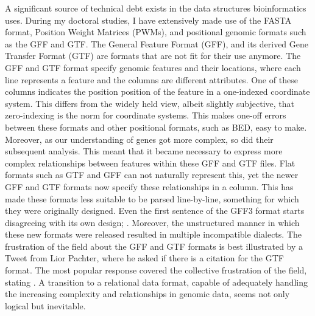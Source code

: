 A significant source of technical debt exists in the data structures bioinformatics uses. During my doctoral studies, I have extensively made use of the FASTA format, Position Weight Matrices (PWMs), and positional genomic formats such as the GFF and GTF. The General Feature Format (GFF), and its derived Gene Transfer Format (GTF) are formats that are not fit for their use anymore. The GFF and GTF format specify genomic features and their locations, where each line represents a feature and the columns are different attributes. One of these columns indicates the position position of the feature in a one-indexed coordinate system. This differs from the widely held view, albeit slightly subjective, that zero-indexing is the norm for coordinate systems\cite{utexasEWDijkstra}. This makes one-off errors between these formats and other positional formats, such as BED, easy to make. Moreover, as our understanding of genes got more complex, so did their subsequent analysis. This meant that it became necessary to express more complex relationships between features within these GFF and GTF files. Flat formats such as GTF and GFF can not naturally represent this, yet the newer GFF and GTF formats now specify these relationships in a  column. This has made these formats less suitable to be parsed line-by-line, something for which they were originally designed. Even the first sentence of the GFF3 format starts disagreeing with its own design; \cite{GFFformat}. Moreover, the unstructured manner in which these new formats were released resulted in multiple incompatible dialects. The frustration of the field about the GFF and GTF formats is best illustrated by a Tweet from Lior Pachter, where he asked if there is a citation for the GTF format. The most popular response covered the collective frustration of the field, stating \cite{Pachter_2023}. A transition to a relational data format, capable of adequately handling the increasing complexity and relationships in genomic data, seems not only logical but inevitable.

